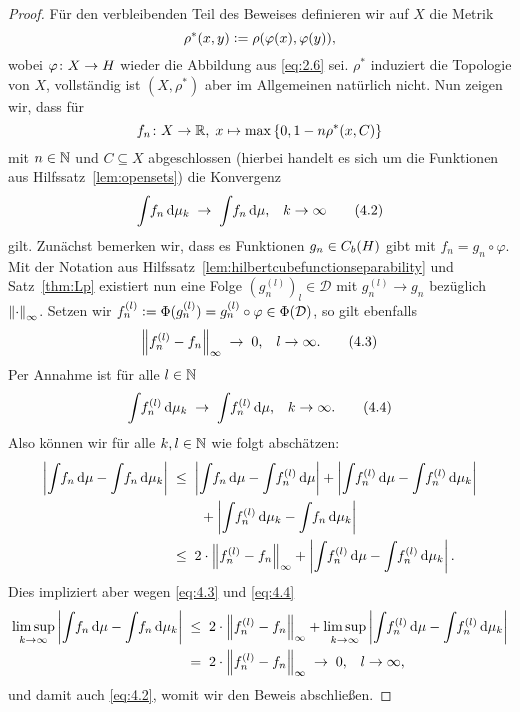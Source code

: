 \documentclass[../main/main.tex]{subfiles}
\begin{document}
\begin{proof}
		Für den verbleibenden Teil des Beweises definieren wir auf $X$ die Metrik
		\[ \rho^\ast(x, y) \vcentcolon = \rho(\varphi(x), \varphi(y)) \text{,} \]
		wobei $\varphi \colon X \to H$ wieder die Abbildung aus \eqref{eq:2.6} sei. 
		$\rho^\ast$ induziert die Topologie von $X$, vollständig ist $(X, \rho^\ast)$ 
		aber im Allgemeinen natürlich nicht. Nun zeigen wir, dass für 
		\[f_n \colon X \to \mathbb{R}, \; x \mapsto \max \left\{0, 1-n \rho^\ast(x, C)\right\} \] 
		mit $n \in \mathbb{N}$ und $C \subseteq X$ abgeschlossen (hierbei handelt es sich 
		um die Funktionen aus Hilfssatz~\ref{lem:opensets}) die Konvergenz
		\[ \int_{} \, f_n \, \mathrm{d}\mu_k \; \to \; \int_{} \, f_n \, \mathrm{d}\mu \text{,} 
		\quad k \to \infty \label{eq:4.2} \tag{4.2}\]
		gilt. Zunächst bemerken wir, dass es Funktionen $g_n \in C_b(H)$ 
		gibt mit $f_n = g_n \circ \varphi$. Mit der Notation aus 
		Hilfssatz~\ref{lem:hilbertcubefunctionseparability} und Satz~\ref{thm:Lp} 
		existiert nun eine Folge $(g_n^{(l)})_l \in \mathcal{D}$ mit $g_n^{(l)} \to g_n$ 
		bezüglich $\left\lVert\cdot\right\rVert_\infty$. Setzen wir 
		$f_n^{(l)} \vcentcolon = \Phi(g_n^{(l)}) = g_n^{(l)} \circ \varphi \in \Phi(\mathcal{D})$, 
		so gilt ebenfalls
		\[ \left\lVert f_n^{(l)} - f_n\right\rVert_\infty \; \to \; 0 \text{,} 
		\quad l \to \infty \text{.} \label{eq:4.3} \tag{4.3} \]
		Per Annahme ist für alle $l \in \mathbb{N}$
		\[ \int_{} \, f_n^{(l)} \, \mathrm{d}\mu_k \; \to \; \int_{} \, f_n^{(l)} \, \mathrm{d}\mu \text{,} 
		\quad k \to \infty \text{.} \label{eq:4.4} \tag{4.4} \]
		Also können wir für alle $k, l \in \mathbb{N}$ wie folgt abschätzen:
		\begin{align*}
			\left| \int_{} \, f_n \, \mathrm{d}\mu - \int_{} \, f_n \, \mathrm{d}\mu_k \right| \; &\leq \; 
			\left| \int_{} \, f_n \, \mathrm{d}\mu - \int_{} \, f_n^{(l)} \, \mathrm{d}\mu \right| + 
			\left| \int_{} \, f_n^{(l)} \, \mathrm{d}\mu - \int_{} \, f_n^{(l)} \, \mathrm{d}\mu_k \right| \\
			& \qquad + 
			\left| \int_{} \, f_n^{(l)} \, \mathrm{d}\mu_k - \int_{} \, f_n \, \mathrm{d}\mu_k \right| \\
			&\leq \; 2 \cdot \left\lVert f_n^{(l)} - f_n\right\rVert_\infty + \left| \int_{} \, f_n^{(l)} \, \mathrm{d}\mu - 
			\int_{} \, f_n^{(l)} \, \mathrm{d}\mu_k \right| \text{.}
		\end{align*}
		Dies impliziert aber wegen \eqref{eq:4.3} und \eqref{eq:4.4}
		\begin{align*}
			\limsup_{k \to \infty} \left| \int_{} \, f_n \, \mathrm{d}\mu - 
			\int_{} \, f_n \, \mathrm{d}\mu_k \right|
			\; &\leq \; 2 \cdot \left\lVert f_n^{(l)} - f_n\right\rVert_\infty + 
			\limsup_{k \to \infty} \left| \int_{} \, f_n^{(l)} \, \mathrm{d}\mu - 
			\int_{} \, f_n^{(l)} \, \mathrm{d}\mu_k \right| \\
			&= \; 2 \cdot \left\lVert f_n^{(l)} - f_n\right\rVert_\infty \; \to \; 0 \text{,} 
			\quad l \to \infty \text{,}
		\end{align*}
		und damit auch \eqref{eq:4.2}, womit wir den Beweis abschließen.
	\end{proof}
\end{document}
